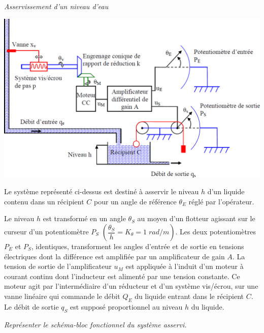 \documentclass[11pt,oneside]{article}
\begin{document}
\begin{exemple}
\textit{Asservissement d'un niveau d'eau}
\begin{center}
    \includegraphics[width=\textwidth]{png/Exo3_01}
\end{center}

Le système représenté ci-dessus est destiné à asservir le niveau $h$ d'un liquide contenu dans un récipient $C$ pour un angle de référence $\theta_E$ réglé par l'opérateur.

Le niveau $h$ est transformé en un angle $\theta_S$ au moyen d'un flotteur agissant sur le curseur d'un potentiomètre $P_S$ $\left(\dfrac{\theta_S}{h}=K_\theta=1\;rad/m\right)$. Les deux potentiomètres $P_E$ et $P_S$, identiques, transforment les angles d'entrée et de sortie en tensions électriques dont la différence est amplifiée par un amplificateur de gain $A$. La tension de sortie de l'amplificateur $u_M$ est appliquée à l'induit d'un moteur à courant continu dont l'inducteur est alimenté par une tension constante. Ce moteur agit par l'intermédiaire d'un réducteur et d'un système vis/écrou, sur une vanne linéaire qui commande le débit $Q_E$ du liquide entrant dans le récipient $C$. Le débit de sortie $q_S$ est supposé proportionnel au niveau $h$ du liquide. 

\textit{Représenter le schéma-bloc fonctionnel du système asservi.}

\end{exemple}
\end{document}
